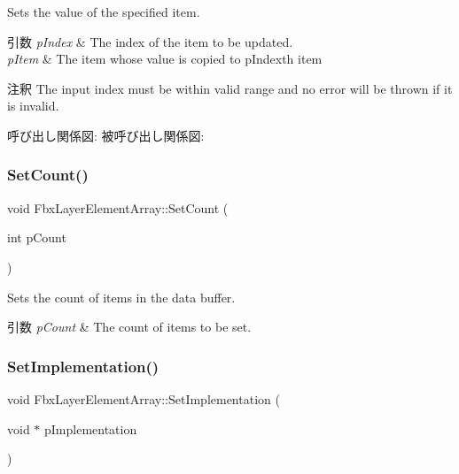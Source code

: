 Sets the value of the specified item. 
\begin{DoxyParams}{引数}
{\em p\+Index} & The index of the item to be updated. \\
\hline
{\em p\+Item} & The item whose value is copied to p\+Index\textquotesingle{}th item \\
\hline
\end{DoxyParams}
\begin{DoxyRemark}{注釈}
The input index must be within valid range and no error will be thrown if it is invalid. 
\end{DoxyRemark}
呼び出し関係図\+:
被呼び出し関係図\+:
\mbox{\label{class_fbx_layer_element_array_a3a8d1c285bb30e8d0dfdf71f819fa57b}} 
\subsubsection{\texorpdfstring{Set\+Count()}{SetCount()}}
{\footnotesize\ttfamily void Fbx\+Layer\+Element\+Array\+::\+Set\+Count (\begin{DoxyParamCaption}\item[{int}]{p\+Count }\end{DoxyParamCaption})}

Sets the count of items in the data buffer. 
\begin{DoxyParams}{引数}
{\em p\+Count} & The count of items to be set. \\
\hline
\end{DoxyParams}
\mbox{\label{class_fbx_layer_element_array_aa031d26b76ef7871ac0d35a8dff6462a}} 
\subsubsection{\texorpdfstring{Set\+Implementation()}{SetImplementation()}}
{\footnotesize\ttfamily void Fbx\+Layer\+Element\+Array\+::\+Set\+Implementation (\begin{DoxyParamCaption}\item[{void $\ast$}]{p\+Implementation }\end{DoxyParamCaption})\hspace{0.3cm}{\ttfamily [protected]}}

